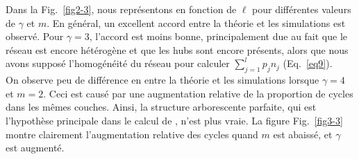 Dans la Fig.~\ref{fig2-3}, nous représentons \nl en fonction de $\ell$ pour différentes valeurs de $\gamma$ et $m$. En général, un excellent accord entre la théorie et les simulations est observé. Pour $\gamma=3$, l'accord est moins bonne, principalement due au fait que le réseau est encore hétérogène et que les hubs sont encore présents, alors que nous avons supposé l'homogénéité du réseau pour calculer $\sum_{j=1}^{l} p_jn_j$ (Eq.~\eqref{eq9}).\\
On observe peu de différence en \nl entre la théorie et les simulations lorsque $ \gamma = 4 $ et $ m = 2 $. Ceci est causé par une augmentation relative de la proportion de cycles dans les mêmes couches. Ainsi, la structure arborescente parfaite, qui est l'hypothèse principale dans le calcul de \nl, n'est plus vraie. La figure Fig.~\ref{fig3-3} montre clairement l'augmentation relative des cycles quand $ m $ est abaissé, et $ \gamma $ est augmenté.
